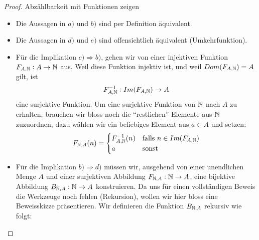 \begin{proof}{Abzählbarkeit mit Funktionen zeigen}
    \begin{itemize}
        \item Die Aussagen in $a)$ und $b)$ sind per Definition äquivalent.
        \item Die Aussagen in $d)$ und $e)$ sind offensichtlich äquivalent (Umkehrfunktion).
        \item Für die Implikation $c)\Rightarrow b)$, gehen wir von einer injektiven Funktion $F_{A,\mathbb{N}}:A\to\mathbb{N}$ aus.
        Weil diese Funktion injektiv ist, und weil $Dom(F_{A,\mathbb{N}})=A$ gilt, ist
        \begin{align*}
            F_{A,\mathbb{N}}^{-1}:Im(F_{A,\mathbb{N}}) \to A
        \end{align*}
        eine surjektive Funktion. Um eine surjektive Funktion von $\mathbb{N}$ nach $A$ zu erhalten, brauchen wir bloss noch die ``restlichen'' Elemente aus $\mathbb{N}$ zuzuordnen, dazu wählen wir ein beliebiges Element aus $a\in A$ und setzen:
        \begin{align*}
            F_{\mathbb{N},A}(n)=
                \begin{cases}
                F_{A,\mathbb{N}}^{-1}(n)&\text{falls }n\in Im(F_{A,\mathbb{N}})\\
                a&\text{sonst}
                \end{cases}
        \end{align*}
        \item Für die Implikation $b)\Rightarrow d)$ müssen wir, ausgehend von einer unendlichen Menge $A$ und einer surjektiven Abbildung $F_{\mathbb{N},A}: \mathbb{N}\to A$, eine bijektive Abbildung $B_{\mathbb{N},A}: \mathbb{N}\to A$ konstruieren. Da uns für einen vollständigen Beweis die Werkzeuge noch fehlen (Rekursion), wollen wir hier bloss eine Beweisskizze präsentieren. Wir definieren die Funktion $B_{\mathbb{N},A}$ rekursiv wie folgt:

\end{itemize}
\end{proof}
